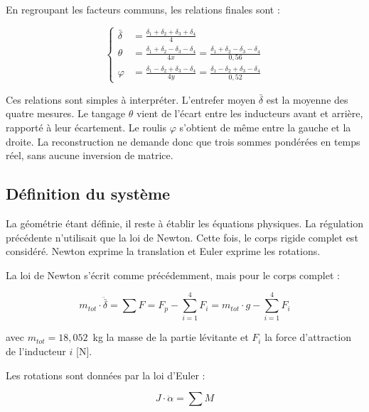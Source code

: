 En regroupant les facteurs communs, les relations finales sont :

\begin{equation}
    \left\{
    \begin{aligned}
        \bar\delta & = \frac{\delta_1 + \delta_2 + \delta_3 + \delta_4}{4}  \\[6pt]
        \theta     & = \frac{\delta_1 + \delta_2 - \delta_3 - \delta_4}{4x}
        = \frac{\delta_1 + \delta_2 - \delta_3 - \delta_4}{0{,}56}          \\[6pt]
        \varphi    & = \frac{\delta_1 - \delta_2 + \delta_3 - \delta_4}{4y}
        = \frac{\delta_1 - \delta_2 + \delta_3 - \delta_4}{0{,}52}
    \end{aligned}
    \right.
\end{equation}

Ces relations sont simples à interpréter. L'entrefer moyen $\bar\delta$ est la moyenne des quatre mesures. Le tangage $\theta$ vient de l'écart entre les inducteurs avant et arrière, rapporté à leur écartement. Le roulis $\varphi$ s'obtient de même entre la gauche et la droite. La reconstruction ne demande donc que trois sommes pondérées en temps réel, sans aucune inversion de matrice.

\subsection{Définition du système}
\label{subsec:DefSysteme}
La géométrie étant définie, il reste à établir les équations physiques. La régulation précédente n'utilisait que la loi de Newton. Cette fois, le corps rigide complet est considéré. Newton exprime la translation et Euler \cite{Euler} exprime les rotations.

La loi de Newton s'écrit comme précédemment, mais pour le corps complet :

\begin{equation}
    m_{tot} \cdot \ddot{\bar\delta} = \sum F
    = F_p - \sum_{i=1}^{4} F_i
    = m_{tot} \cdot g - \sum_{i=1}^{4} F_i
    \label{eq:newton-mimo}
\end{equation}

avec $m_{tot} = 18{,}052$~kg la masse de la partie lévitante et $F_i$ la force d'attraction de l'inducteur $i$ [N].

Les rotations sont données par la loi d'Euler :

\begin{equation}
    J \cdot \ddot{\alpha} = \sum M
\end{equation}

